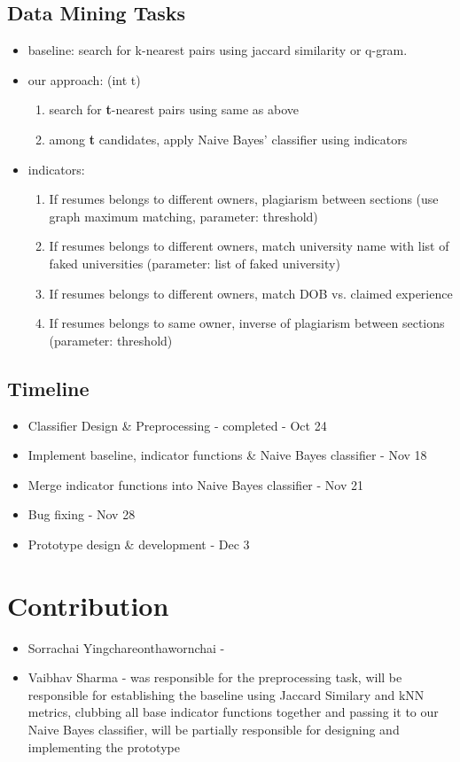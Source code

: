 \documentclass{article}
\begin{document}
\subsection{Data Mining Tasks}
\begin{itemize}
	\item baseline: search for k-nearest pairs using jaccard similarity or q-gram. 
	\item our approach: (int t)
	\begin{enumerate}
		\item search for \textbf{t}-nearest pairs using same as above
		\item among \textbf{t} candidates, apply Naive Bayes' classifier using indicators
	\end{enumerate}
	\item indicators:
	\begin{enumerate}
		\item If resumes belongs to different owners, plagiarism between sections (use graph maximum matching, parameter: threshold)
		\item If resumes belongs to different owners, match university name with list of faked universities (parameter: list of faked university) 
		\item If resumes belongs to different owners, match DOB vs. claimed experience
		\item If resumes belongs to same owner, inverse of plagiarism between sections (parameter: threshold)
	\end{enumerate}
\end{itemize}
   
\subsection{Timeline}
\begin{itemize}
\item Classifier Design \& Preprocessing - completed - Oct 24
\item Implement baseline, indicator functions \& Naive Bayes classifier - Nov 18
\item Merge indicator functions into Naive Bayes classifier - Nov 21
\item Bug fixing - Nov 28
\item Prototype design \& development - Dec 3
\end{itemize}



\section{Contribution}
\begin{itemize}
\item Sorrachai Yingchareonthawornchai -
\item Vaibhav Sharma - was responsible for the preprocessing task, will be responsible for establishing the baseline using Jaccard Similary and kNN metrics, clubbing all base indicator functions together and passing it to our Naive Bayes classifier, will be partially responsible for designing and implementing the prototype
\end{itemize}
\end{document}
